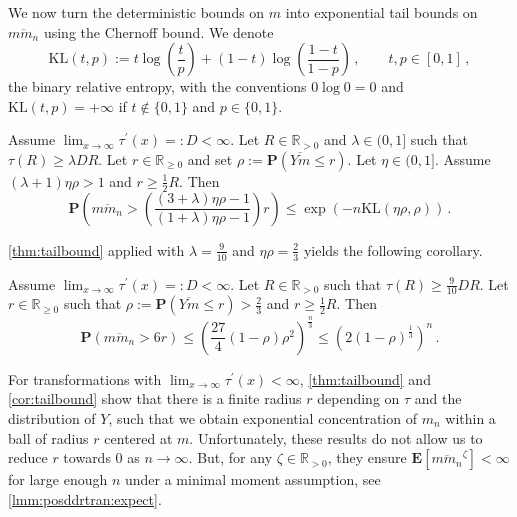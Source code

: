 \documentclass{article}
\newcommand{\R}{\mathbb{R}}
\newcommand{\Rp}{\R_{\geq0}}
\newcommand{\Rpp}{\R_{>0}}
\newcommand{\lb}{\left(} %
\newcommand{\rb}{\right)} %
\newcommand{\br}[1]{\lb #1 \rb} %
\newcommand{\brOf}[1]{\!\br{#1}} %
\renewcommand{\Pr}{\mathbf{P}} %
\newcommand{\Prof}[1]{\Pr(#1)}
\newcommand{\PrOf}[1]{\Pr\brOf{#1}}
\newcommand{\E}{\mathbf{E}} %
\newcommand{\Eof}[1]{\E[#1]}
\newcommand{\pr}{^\prime}
\newcommand{\eqcm}{\,,} %
\newcommand{\eqfs}{\,.}
\newcommand{\kullback}{\mathrm{K\!L}} %
\newcommand{\ol}[2]{\overline{#1#2}}
\newcommand{\tran}{\tau}
\newcommand{\dtran}{\tau\pr}
\begin{document}
%
We now turn the deterministic bounds on $m$ into exponential tail bounds on $\ol m{m_n}$ using the Chernoff bound. We denote
\begin{equation}
    \kullback(t, p)
    := t \log\brOf{\frac{t}{p}} + (1-t) \log\brOf{\frac{1-t}{1-p}}
    \eqcm
    \qquad t, p \in [0,1]
    \eqcm
\end{equation}
the binary relative entropy, with the conventions $0 \log 0 = 0$ and $\kullback(t,p) = +\infty$ if $t \notin \{0,1\}$ and $p \in \{0,1\}$.
%
\begin{theorem}\label{thm:tailbound}
    Assume $\lim_{x\to\infty}\dtran(x) =: D < \infty$.
    Let $R \in \Rpp$ and $\lambda \in (0,1]$ such that $\tran(R) \geq \lambda D R$.
    Let $r \in \Rp$ and set $\rho := \Prof{\ol Ym \leq r}$.
    Let $\eta \in (0,1]$.
    Assume $(\lambda + 1)\eta\rho > 1$ and $r \geq \frac12R$.
    Then
    \begin{equation}
        \PrOf{\ol m{m_n} > \br{\frac{\br{3 + \lambda}\eta\rho - 1}{\br{1 + \lambda}\eta\rho - 1}} r}
        \leq
        \exp\brOf{-n \kullback(\eta\rho, \rho)}
        \eqfs
    \end{equation}
\end{theorem}
%
\cref{thm:tailbound} applied with $\lambda = \frac9{10}$ and $\eta\rho = \frac23$ yields the
following corollary.
%
\begin{corollary}\label{cor:tailbound}
    Assume $\lim_{x\to\infty}\dtran(x) =: D < \infty$.
    Let $R \in \Rpp$ such that $\tran(R) \geq \frac9{10} D R$.
    Let $r \in \Rp$ such that $\rho := \Prof{\ol Ym \leq r} > \frac23$ and $r \geq \frac12 R$.
    Then
    \begin{equation}
        \PrOf{\ol m{m_n} > 6r}
        \leq
        \br{\frac{27}{4} (1-\rho) \rho^2}^{\frac n3}
        \leq
        \br{2 (1-\rho)^{\frac13}}^{n}
        \eqfs
    \end{equation}
\end{corollary}
%
\begin{remark}
     For transformations with $\lim_{x\to\infty}\dtran(x) < \infty$, \cref{thm:tailbound} and \cref{cor:tailbound} show that there is a finite radius $r$ depending on $\tran$ and the distribution of $Y$, such that we obtain exponential concentration of $m_n$ within a ball of radius $r$ centered at $m$. Unfortunately, these results do not allow us to reduce $r$ towards $0$ as $n\to\infty$. But, for any $\zeta\in\Rpp$, they ensure $\Eof{\ol{m}{m_n}^\zeta} < \infty$ for large enough $n$ under a minimal moment assumption, see \cref{lmm:posddrtran:expect}.
\end{remark}
\end{document}
